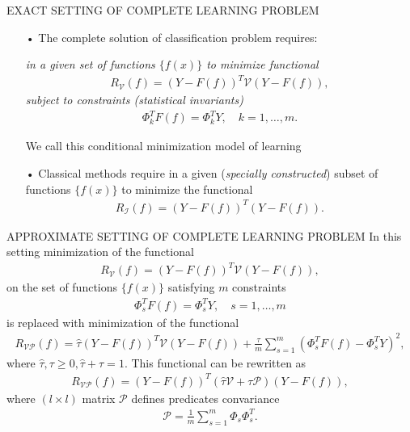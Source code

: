 \documentclass[11pt]{beamer}
\begin{document}
\begin{frame}{EXACT SETTING OF COMPLETE LEARNING PROBLEM}
\begin{enumerate}
\item[•] The complete solution of classification problem requires:

\emph{in a given set of functions $\{f(x)\}$ to minimize functional}
\begin{align*}
R_{\mathcal{V}}(f) = (Y - F(f))^{T}\mathcal{V}(Y - F(f)),
\end{align*}
\emph{subject to constraints (statistical invariants)}
\begin{align*}
\Phi_{k}^{T}F(f) = \Phi_{k}^{T}Y, \quad k = 1, \ldots, m.
\end{align*}

We call this conditional minimization model of learning
\item[•] Classical methods require in a given (\emph{specially constructed}) subset of functions $\{f(x)\}$ to minimize the functional
\begin{align*}
R_{\mathcal{I}}(f) = (Y - F(f))^{T}(Y - F(f)).
\end{align*}
\end{enumerate}
\end{frame}

\begin{frame}{APPROXIMATE SETTING OF COMPLETE LEARNING PROBLEM}
In this setting minimization of the functional
\begin{align*}
R_{\mathcal{V}}(f) = (Y - F(f))^{T}\mathcal{V}(Y - F(f)),
\end{align*}
on the set of functions $\{f(x)\}$ satisfying $m$ constraints
\begin{align*}
\Phi_{s}^{T}F(f) = \Phi_{s}^{T}Y, \quad s = 1, \ldots, m
\end{align*}
is replaced with minimization of the functional
\begin{align*}
R_{\mathcal{VP}}(f) = \hat{\tau}(Y - F(f))^{T}\mathcal{V}(Y - F(f)) + \frac{\tau}{m}\sum_{s=1}^{m}(\Phi_{s}^{T}F(f) - \Phi_{s}^{T}Y)^{2},
\end{align*}
where $\hat{\tau}, \tau \geq 0, \hat{\tau} + \tau = 1$. This functional can be rewritten as
\begin{align*}
R_{\mathcal{VP}}(f) = (Y - F(f))^{T}(\hat{\tau}\mathcal{V} + \tau\mathcal{P})(Y - F(f)),
\end{align*}
where $(l \times l)$ matrix $\mathcal{P}$ defines predicates convariance
\begin{align*}
\mathcal{P} = \frac{1}{m}\sum_{s=1}^{m}\Phi_{s}\Phi_{s}^{T}.
\end{align*}
\end{frame}
\end{document}
